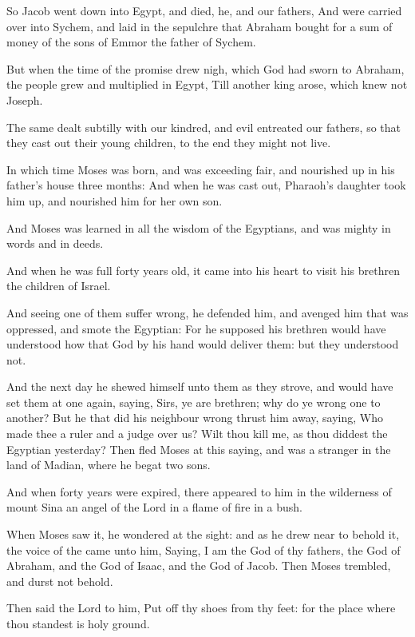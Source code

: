 \verse So Jacob went down into Egypt, and died, he, and our fathers, \verse And were carried over into Sychem, and laid in the sepulchre that Abraham bought for a sum of money of the sons of Emmor the father of Sychem.

\verse But when the time of the promise drew nigh, which God had sworn to Abraham, the people grew and multiplied in Egypt, \verse Till another king arose, which knew not Joseph.

\verse The same dealt subtilly with our kindred, and evil entreated our fathers, so that they cast out their young children, to the end they might not live.

\verse In which time Moses was born, and was exceeding fair, and nourished up in his father's house three months: \verse And when he was cast out, Pharaoh's daughter took him up, and nourished him for her own son.

\verse And Moses was learned in all the wisdom of the Egyptians, and was mighty in words and in deeds.

\verse And when he was full forty years old, it came into his heart to visit his brethren the children of Israel.

\verse And seeing one of them suffer wrong, he defended him, and avenged him that was oppressed, and smote the Egyptian: \verse For he supposed his brethren would have understood how that God by his hand would deliver them: but they understood not.

\verse And the next day he shewed himself unto them as they strove, and would have set them at one again, saying, Sirs, ye are brethren; why do ye wrong one to another?  \verse But he that did his neighbour wrong thrust him away, saying, Who made thee a ruler and a judge over us?  \verse Wilt thou kill me, as thou diddest the Egyptian yesterday?  \verse Then fled Moses at this saying, and was a stranger in the land of Madian, where he begat two sons.

\verse And when forty years were expired, there appeared to him in the wilderness of mount Sina an angel of the Lord in a flame of fire in a bush.

\verse When Moses saw it, he wondered at the sight: and as he drew near to behold it, the voice of the \LORD came unto him, \verse Saying, I am the God of thy fathers, the God of Abraham, and the God of Isaac, and the God of Jacob. Then Moses trembled, and durst not behold.

\verse Then said the Lord to him, Put off thy shoes from thy feet: for the place where thou standest is holy ground.

